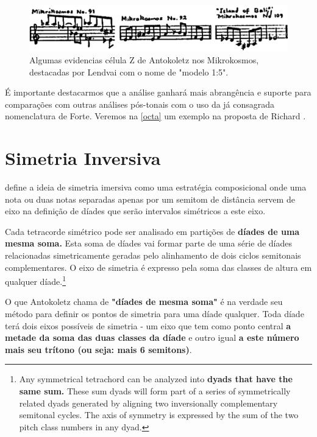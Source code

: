 \documentclass[
	12pt,				%
	openright,			%
	twoside,			%
	a4paper,			%
	english,			%
	french,				%
	spanish,			%
	brazil				%
	]{abntex2}
\begin{document}
\begin{figure}[!h]
	\caption{\label{fig_grafico}Algumas evidencias célula Z de Antokoletz nos Mikrokosmos, destacadas por Lendvai com o nome de "modelo 1:5". }
	\begin{center}
	    \includegraphics[scale=0.4]{intervalar/Lendvai_p52_ZCell.png}
	\end{center}
\end{figure}

É importante destacarmos que a análise ganhará mais abrangência e suporte para comparações com outras análises pós-tonais com o uso da já consagrada nomenclatura de Forte. Veremos na \autoref{octa} um exemplo na proposta de Richard . 
 
\section{Simetria Inversiva}
\label{simetria}

 define a ideia de simetria imersiva como uma estratégia composicional onde uma nota ou duas notas separadas apenas por um semitom de distância servem de eixo na definição de díades que serão intervalos simétricos a este eixo.

\begin{citacao}

Cada tetracorde simétrico pode ser analisado em partições de \textbf{díades de uma mesma soma.} Esta soma de díades vai formar parte de uma série de díades relacionadas simetricamente geradas pelo alinhamento de dois ciclos semitonais complementares. O eixo de simetria é expresso pela soma das classes de altura em qualquer díade.\cite[ p.72]{antokoletz1984music}\footnote{Any symmetrical tetrachord can be analyzed into\textbf{ dyads that have the same sum.} These sum dyads will form part of a series of symmetrically related dyads generated by aligning two inversionally complementary semitonal cycles. The axis of symmetry is expressed by the sum of the two pitch class numbers in any dyad.\cite[ p.72, grifo nosso]{antokoletz1984music}}
\end{citacao}

O que Antokoletz chama de \textbf{"díades de mesma soma"} é na verdade seu método para definir os pontos de simetria para uma díade qualquer. Toda díade terá dois eixos possíveis de simetria - um eixo que tem como ponto central \textbf{a metade da soma das duas classes da díade} e outro igual \textbf{a este número mais seu trítono (ou seja: mais 6 semitons)}. 
\end{document}
